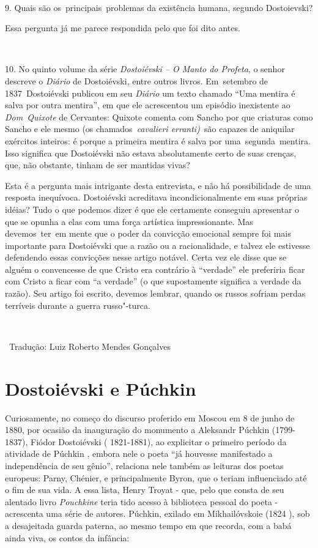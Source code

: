 ~

9. Quais são os~principais~problemas da existência humana, segundo
Dostoievski?

Essa pergunta já me parece respondida pelo que foi dito antes.

~

10. No quinto volume da série \emph{Dostoiévski -- O Manto do Profeta}, o
senhor descreve o \emph{Diário} de Dostoiévski, entre outros livros.
Em~setembro de 1837~Dostoiévski publicou em seu \emph{Diário} um texto
chamado ``Uma mentira é salva por outra mentira'', em que ele acrescentou
um episódio inexistente ao \emph{Dom~Quixote} de Cervantes: Quixote comenta
com Sancho por que criaturas como Sancho e ele mesmo (os
chamados~\emph{cavalieri erranti)~}são capazes de aniquilar exércitos
inteiros: é porque a primeira mentira é salva por uma~segunda~mentira.
Isso significa que Dostoiévski não estava absolutamente certo de suas
crenças, que, não obstante, tinham de ser mantidas vivas?

Esta é a pergunta mais intrigante desta entrevista, e não há
possibilidade de uma resposta inequívoca. Dostoiévski acreditava
incondicionalmente em suas próprias idéias? Tudo o que podemos dizer é
que ele certamente conseguiu apresentar o que se opunha a elas com uma
força artística impressionante. Mas devemos~ter~em mente que o poder da
convicção emocional sempre foi mais importante para Dostoiévski que a
razão ou a racionalidade, e talvez ele estivesse defendendo essas
convicções nesse artigo notável. Certa vez ele disse que se alguém o
convencesse de que Cristo era contrário à ``verdade'' ele preferiria ficar
com Cristo a ficar com ``a verdade'' (o que supostamente significa a
verdade da razão). Seu artigo foi escrito, devemos lembrar, quando os
russos sofriam perdas terríveis durante a guerra russo"-turca.

~

~Tradução: Luiz Roberto Mendes Gonçalves

\chapter{Dostoiévski e Púchkin}

Curiosamente, no começo do discurso proferido em Moscou em 8 de junho de
1880, por ocasião da inauguração do monumento a Aleksandr Púchkin
(1799-1837), Fiódor Dostoiévski ( 1821-1881), ao explicitar o primeiro
período da atividade de Púchkin , embora nele o poeta ``já houvesse
manifestado a independência de seu gênio'', relaciona nele também as
leituras dos poetas europeus: Parny, Chénier, e principalmente Byron,
que o teriam influenciado até o fim de sua vida. A essa lista, Henry
Troyat - que, pelo que consta de seu alentado livro \emph{Pouchkine}
teria tido acesso à biblioteca pessoal do poeta - acrescenta uma série
de autores. Púchkin, exilado em Mikhailóvskoie (1824 ), sob a
desajeitada guarda paterna, ao mesmo tempo em que recorda, com a babá
ainda viva, os contos da infância:

